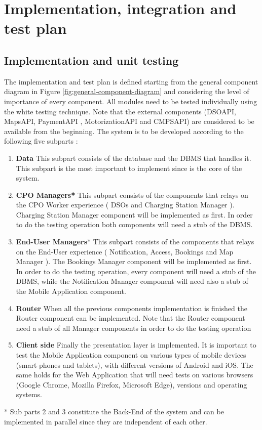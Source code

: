 \documentclass[a4paper]{report}
\begin{document}
\chapter{Implementation, integration and test plan}
\section{Implementation and unit testing}
The implementation and test plan is defined starting from the general component diagram in Figure \ref{fig:general-component-diagram} and considering the level of importance of every component. All modules need to be tested individually using the white testing technique. Note that the external components (DSOAPI, MapsAPI, PaymentAPI , MotorizationAPI and CMPSAPI) are considered
to be available from the beginning. The system is to be developed according to the following five subparts :
\begin{enumerate}
    \item \textbf{Data}\newline
    This subpart consists of the database and the DBMS that handles it. This subpart is the most important to implement since is the core of the system.
    \item \textbf{CPO Managers*}\newline
    This subpart consists of the components that relays on the CPO Worker experience ( DSOs and Charging Station Manager ). Charging Station Manager component will be implemented as first. In order to do the testing operation both components will need a stub of the DBMS.
    \item \textbf{End-User Managers}*\newline
    This subpart consists of the components that relays on the End-User experience ( Notification, Access, Bookings and Map Manager ). The Bookings Manager component will be implemented as first. In order to do the testing operation, every component will need a stub of the DBMS, while the Notification Manager component will need also a stub of the Mobile Application component.
    \item \textbf{Router}\newline
    When all the previous components implementation is finished the Router component can be implemented. Note that the Router component need a stub of all Manager components in order to do the testing operation
    \item \textbf{Client side}\newline
    Finally the presentation layer is implemented. It is important to test the Mobile Application component on various types of mobile devices (smart-phones and tablets), with different versions of Android and iOS. The same holds for the Web Application that will need tests on various browsers (Google Chrome, Mozilla Firefox, Microsoft Edge), versions and operating systems.
\end{enumerate}
* Sub parts 2 and 3 constitute the Back-End of the system and can be implemented in parallel since they are independent of each other.
\end{document}
